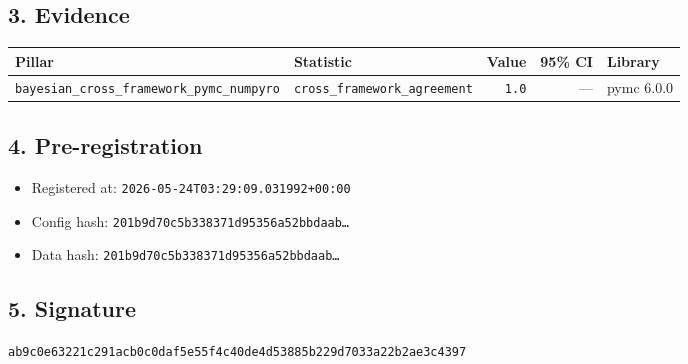 \documentclass{article}
\begin{document}
\subsection*{3. Evidence}
\begin{tabular}{llrrl}\toprule
\textbf{Pillar} & \textbf{Statistic} & \textbf{Value} & \textbf{95\% CI} & \textbf{Library} \\\midrule
\texttt{bayesian\_cross\_framework\_pymc\_numpyro} & \texttt{cross\_framework\_agreement} & \texttt{1.0} & --- & pymc 6.0.0 \\
\bottomrule\end{tabular}
\subsection*{4. Pre-registration}
\begin{itemize}
\item Registered at: \texttt{2026-05-24T03:29:09.031992+00:00}
\item Config hash: \texttt{201b9d70c5b338371d95356a52bbdaab\dots}
\item Data hash: \texttt{201b9d70c5b338371d95356a52bbdaab\dots}
\end{itemize}
\subsection*{5. Signature}
\texttt{ab9c0e63221c291acb0c0daf5e55f4c40de4d53885b229d7033a22b2ae3c4397}\\
\end{document}
